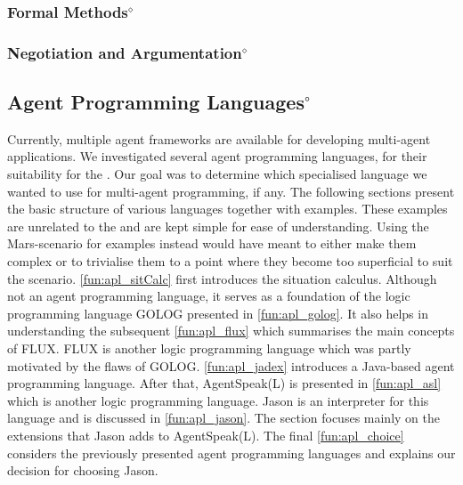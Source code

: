

\subsubsection[Formal Methods]{Formal Methods$^\diamond$}\label{fun:formal_methods}


\subsubsection[Negotiation and Argumentation]{Negotiation and Argumentation$^\diamond$}\label{fun:negotiation}


\subsection[Agent Programming Languages]{Agent Programming Languages$^\circ$}\label{fun:apl}
Currently, multiple agent frameworks are available for developing multi-agent applications.
We investigated several agent programming languages, for their suitability for the \mars{}.
Our goal was to determine which specialised language we wanted to use for multi-agent programming, if any.
The following sections present the basic structure of various languages together with examples.
These examples are unrelated to the \mars{} and are kept simple for ease of understanding.
Using the Mars-scenario for examples instead would have meant to either make them complex or to trivialise them to a point where they become too superficial to suit the scenario.
\autoref{fun:apl_sitCalc} first introduces the situation calculus.
Although not an agent programming language, it serves as a foundation of the logic programming language GOLOG presented in \autoref{fun:apl_golog}.
It also helps in understanding the subsequent \autoref{fun:apl_flux} which summarises the main concepts of FLUX.
FLUX is another logic programming language which was partly motivated by the flaws of GOLOG.
\autoref{fun:apl_jadex} introduces a Java-based agent programming language.
After that, AgentSpeak(L) is presented in \autoref{fun:apl_asl} which is another logic programming language.
Jason is an interpreter for this language and is discussed in \autoref{fun:apl_jason}.
The section focuses mainly on the extensions that Jason adds to AgentSpeak(L).
The final \autoref{fun:apl_choice} considers the previously presented agent programming languages and explains our decision for choosing Jason.














